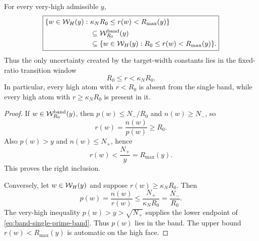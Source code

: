 \begin{theorem}
\label{thm:band-exact-window-sandwich}
For every very-high admissible \(y\),
\begin{equation}
 \boxed{
 \begin{aligned}
 \{w\in\mathcal W_H(y):\ &\kappa_NR_0\le r(w)<R_{\max}(y)\}
 \\
 &\subseteq \mathcal W_{R_0}^{\rm band}(y)
 \\
 &\subseteq
 \{w\in\mathcal W_H(y):R_0\le r(w)<R_{\max}(y)\}.
 \end{aligned}}
 \label{eq:band-exact-window-sandwich}
\end{equation}
Thus the only uncertainty created by the target-width constants lies in
the fixed-ratio transition window
\begin{equation}
 R_0\le r<\kappa_NR_0.
 \label{eq:band-transition-window}
\end{equation}
In particular, every high atom with \(r<R_0\) is absent from the single
band, while every high atom with \(r\ge\kappa_NR_0\) is present in it.
\end{theorem}

\begin{proof}
If \(w\in\mathcal W_{R_0}^{\rm band}(y)\), then
\(p(w)\le N_-/R_0\) and \(n(w)\ge N_-\), so
\begin{equation}
 r(w)=\frac{n(w)}{p(w)}\ge R_0.
 \label{eq:band-right-inclusion-lower}
\end{equation}
Also \(p(w)>y\) and \(n(w)\le N_+\), hence
\begin{equation}
 r(w)<\frac{N_+}{y}=R_{\max}(y).
 \label{eq:band-right-inclusion-upper}
\end{equation}
This proves the right inclusion.

Conversely, let \(w\in\mathcal W_H(y)\) and suppose
\(r(w)\ge\kappa_NR_0\).  Then
\begin{equation}
 p(w)=\frac{n(w)}{r(w)}
 \le\frac{N_+}{\kappa_NR_0}
 =\frac{N_-}{R_0}.
 \label{eq:band-left-inclusion-upper}
\end{equation}
The very-high inequality \(p(w)>y>\sqrt{N_+}\) supplies the lower endpoint
of \eqref{eq:band-single-prime-band}.  Thus \(p(w)\) lies in the band.
The upper bound \(r(w)<R_{\max}(y)\) is automatic on the high face.
\end{proof}


